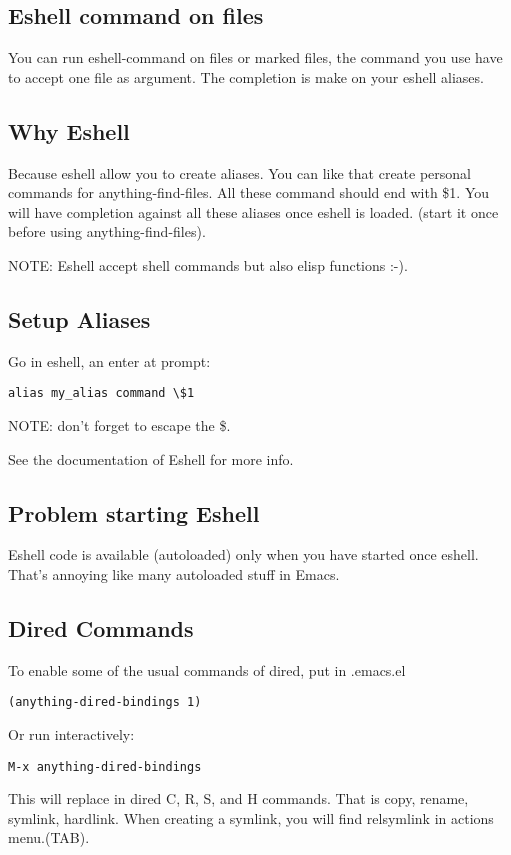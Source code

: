 \documentclass[a4paper,11pt]{article}
\begin{document}
\subsection{Eshell command on files}
\label{sec:eshell-command-files}
You can run eshell-command on files or marked files, the command you use have to accept
one file as argument.
The completion is make on your eshell aliases.

\subsection{Why Eshell}
\label{sec:why-eshell}
Because eshell allow you to create aliases.
You can like that create personal commands for anything-find-files.
All these command should end with \$1.
You will have completion against all these aliases once eshell is loaded.
(start it once before using anything-find-files).

NOTE: Eshell accept shell commands but also elisp functions :-).

\subsection{Setup Aliases}
\label{sec:setup-aliases}
Go in eshell, an enter at prompt:
\begin{verbatim}
alias my_alias command \$1
\end{verbatim}
NOTE: don't forget to escape the \$.

See the documentation of Eshell for more info.

\subsection{Problem starting Eshell}
\label{sec:probl-start-eshell}
Eshell code is available (autoloaded) only when you have started once eshell.
That's annoying like many autoloaded stuff in Emacs.
 
\subsection{Dired Commands}
\label{sec:dired-commands}
To enable some of the usual commands of dired, put in .emacs.el
\begin{verbatim}
(anything-dired-bindings 1)
\end{verbatim}
Or run interactively:
\begin{verbatim}
M-x anything-dired-bindings
\end{verbatim}
This will replace in dired C, R, S, and H commands.
That is copy, rename, symlink, hardlink.
When creating a symlink, you will find relsymlink in actions menu.(TAB).
\end{document}

